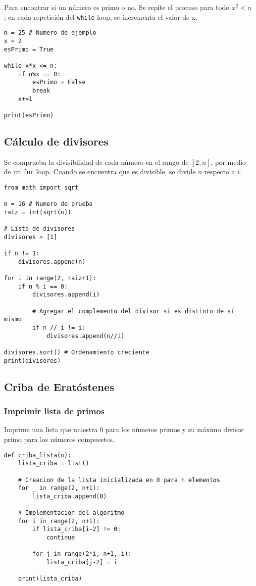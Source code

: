 \documentclass[12pt,letterpaper]{article}
\begin{document}
Para encontrar si un número es primo o no.
Se repite el proceso para todo $x^2 < n$; en cada repetición del \texttt{while} loop, se incrementa el valor de x.

\begin{verbatim}
n = 25 # Numero de ejemplo
x = 2
esPrimo = True

while x*x <= n:
    if n%x == 0:
        esPrimo = False
        break
    x+=1

print(esPrimo)
\end{verbatim}

\subsection{Cálculo de divisores}

Se comprueba la divisibilidad de cada número en el rango de $\left[ 2, n \right]$, por medio de un \texttt{for} loop.
Cuando se encuentra que es divisible, se divide $n$ respecto a $i$.

\begin{verbatim}
from math import sqrt

n = 16 # Numero de prueba
raiz = int(sqrt(n))

# Lista de divisores
divisores = [1]

if n != 1:
    divisores.append(n)

for i in range(2, raiz+1):
    if n % i == 0:
        divisores.append(i)

        # Agregar el complemento del divisor si es distinto de sí mismo
        if n // i != i:
            divisores.append(n//i)

divisores.sort() # Ordenamiento creciente
print(divisores)
\end{verbatim}

\subsection{Criba de Eratóstenes}

\subsubsection{Imprimir lista de primos}

Imprime una lista que muestra 0 para los números primos y su máximo divisor primo para los números compuestos.

\begin{verbatim}
def criba_lista(n):
    lista_criba = list()

    # Creacion de la lista inicializada en 0 para n elementos
    for _ in range(2, n+1):
        lista_criba.append(0)

    # Implementacion del algoritmo
    for i in range(2, n+1):
        if lista_criba[i-2] != 0:
            continue

        for j in range(2*i, n+1, i):
            lista_criba[j-2] = i

    print(lista_criba)
\end{verbatim}
\end{document}

